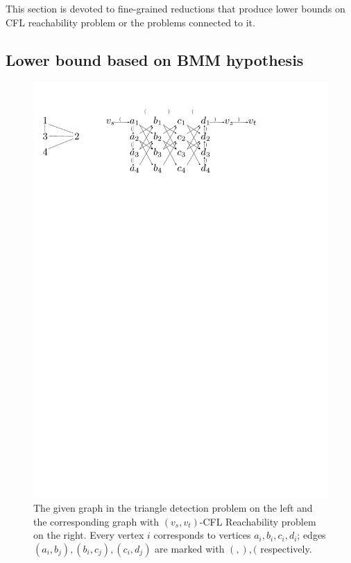 \documentclass[12pt]{article}
\begin{document}
This section is devoted to fine-grained reductions that produce lower bounds on CFL reachability problem or the problems connected to it.

\subsection{Lower bound based on BMM hypothesis}
\label{subsec:lower_from_tr}

\begin{figure}[!htp]
		
	\begin{center}  
		\includegraphics[scale=0.85]{pictures/triangle_detection_example.pdf}
	\end{center}
	
	\caption{The given graph in the triangle detection problem on the left and the corresponding graph with $(v_s, v_t)$-CFL Reachability problem on the right. Every vertex $i$ corresponds to vertices $a_i, b_i, c_i, d_i$; edges $(a_i, b_j), (b_i, c_j), (c_i, d_j)$ are marked with $(, ), ($ respectively.}
	\label{fig:triangle_detection_example}
	
\end{figure}
\end{document}

